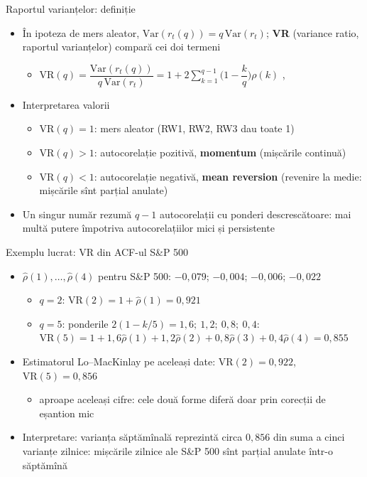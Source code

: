 \begin{frame}{Raportul varianțelor: definiție}
\itemsize{\small}
\begin{itemize}
    \item În ipoteza de mers aleator, $\mathrm{Var}(r_t(q)) = q\,\mathrm{Var}(r_t)$; \textbf{VR} (variance ratio, raportul varianțelor) compară cei doi termeni
    \begin{itemize}
        \item $\mathrm{VR}(q) = \dfrac{\mathrm{Var}(r_t(q))}{q\,\mathrm{Var}(r_t)} = 1 + 2\sum_{k=1}^{q-1}\Big(1 - \dfrac{k}{q}\Big)\rho(k)$ , 
    \end{itemize}
    \item Interpretarea valorii
    \begin{itemize}
        \item $\mathrm{VR}(q) = 1$: mers aleator (RW1, RW2, RW3 dau toate 1)
        \item $\mathrm{VR}(q) > 1$: autocorelație pozitivă, \textbf{momentum} (mișcările continuă)
        \item $\mathrm{VR}(q) < 1$: autocorelație negativă, \textbf{mean reversion} (revenire la medie: mișcările sînt parțial anulate)
    \end{itemize}
    \item Un singur număr rezumă $q - 1$ autocorelații cu ponderi descrescătoare: mai multă putere împotriva autocorelațiilor mici și persistente
\end{itemize}
\end{frame}

\begin{frame}{Exemplu lucrat: VR din ACF-ul S\&P 500}
\itemsize{\small}
\begin{itemize}
    \item $\hat\rho(1), \dots, \hat\rho(4)$ pentru S\&P 500: $-0{,}079$; $-0{,}004$; $-0{,}006$; $-0{,}022$
    \begin{itemize}
        \item $q = 2$: $\mathrm{VR}(2) = 1 + \hat\rho(1) = 0{,}921$
        \item $q = 5$: ponderile $2(1 - k/5) = 1{,}6;\ 1{,}2;\ 0{,}8;\ 0{,}4$: $\mathrm{VR}(5) = 1 + 1{,}6\hat\rho(1) + 1{,}2\hat\rho(2) + 0{,}8\hat\rho(3) + 0{,}4\hat\rho(4) = 0{,}855$
    \end{itemize}
    \item Estimatorul Lo--MacKinlay pe aceleași date: $\mathrm{VR}(2) = 0{,}922$, $\mathrm{VR}(5) = 0{,}856$
    \begin{itemize}
        \item aproape aceleași cifre: cele două forme diferă doar prin corecții de eșantion mic
    \end{itemize}
    \item Interpretare: varianța săptămînală reprezintă circa $0{,}856$ din suma a cinci varianțe zilnice: mișcările zilnice ale S\&P 500 sînt parțial anulate într-o săptămînă
\end{itemize}
\end{frame}

